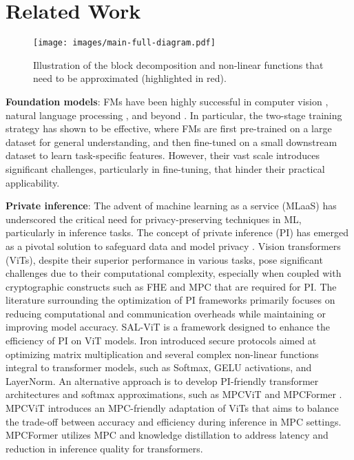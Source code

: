 \section{Related Work}
\label{section: literature-review}

\begin{figure*}[t]
    \centering
    \texttt{[image: images/main-full-diagram.pdf]}
    \caption{Illustration of the block decomposition and non-linear functions that need to be approximated (highlighted in red).}
    \label{fig: main-full-diagram}
    \vspace{-0.5em}
\end{figure*}


\noindent\textbf{Foundation models}:  
FMs have been highly successful in computer vision \cite{dosovitskiy2020image, radford2021learning, liu2021swin}, natural language processing \cite{radford2019language, liu2019roberta, yang2019xlnet, he2020deberta, clark2020electra}, and beyond \cite{sharir2021image, ranasinghe2022self}. In particular, the two-stage training strategy has shown to be effective, where FMs are first pre-trained on a large dataset for general understanding, and then fine-tuned on a small downstream dataset to learn task-specific features. However, their vast scale introduces significant challenges, particularly in fine-tuning, that hinder their practical applicability. 

\noindent\textbf{Private inference}: The advent of machine learning as a service (MLaaS) has underscored the critical need for privacy-preserving techniques in ML, particularly in inference tasks. The concept of private inference (PI) has emerged as a pivotal solution to safeguard data and model privacy \cite{mohassel2017secureml, srinivasan2019delphi, shen2022abnn2, tan2021cryptgpu, zhang2023sal, li2022mpcformer, huang2022cheetah}. Vision transformers (ViTs), despite their superior performance in various tasks, pose significant challenges due to their computational complexity, especially when coupled with cryptographic constructs such as FHE \cite{acar2018survey, gentry2009fully, cheon2017homomorphic} and MPC \cite{goldreich1998secure, knott2021crypten} that are required for PI. The literature surrounding the optimization of PI frameworks primarily focuses on reducing computational and communication overheads while maintaining or improving model accuracy. SAL-ViT \cite{zhang2023sal} is a framework designed to enhance the efficiency of PI on ViT models. Iron \cite{hao2022iron} introduced secure protocols aimed at optimizing matrix multiplication and several complex non-linear functions integral to transformer models, such as Softmax, GELU activations, and LayerNorm. An alternative approach is to develop PI-friendly transformer architectures and softmax approximations, such as MPCViT \cite{zeng2023mpcvit} and MPCFormer \cite{li2022mpcformer}. MPCViT introduces an MPC-friendly adaptation of ViTs that aims to balance the trade-off between accuracy and efficiency during inference in MPC settings. MPCFormer utilizes MPC and knowledge distillation to address latency and reduction in inference quality for transformers.  



